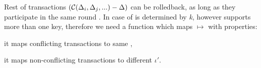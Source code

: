 

Rest of transactions $(\mathcal{C}\text{$(\Delta_{i}, \Delta_{j}, ...)$} - \text{$\Delta$})$ can be rolledback, as long as they participate in the same \paxos round \paxosRoundId. In case of \lwt \paxosRoundId is determined by \emph{k}, however \mpt supports more than one key, therefore we need a function which maps \transaction $\mapsto $ \paxosRoundId with properties: 
\begin{enumerate*}
\item it maps conflicting transactions to same \paxosRoundId,
\item it maps non-conflicting transactions to different $\iota'$.
\end{enumerate*}